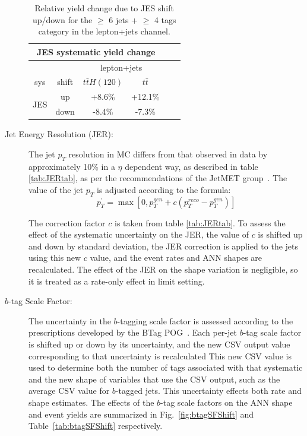 \begin{description}
\begin{table}[h] 
  \centering 
   \begin{tabular}{|c|c|c|c|c|c|} \hline 
\multicolumn{4}{|c|}{JES systematic yield change} \\ \hline
\multicolumn{2}{|c|}{ } & \multicolumn{2}{|c|}{lepton+jets} \\ \hline
sys & shift & $t\bar{t}H(120)$ & $t\bar{t}$  \\ \hline 
\multirow{2}{*}{JES} & up  & +8.6\% & +12.1\% \\
                     & down & -8.4\% & -7.3\% \\ \hline
  \end{tabular} 
  \caption{Relative yield change due to JES shift up/down for the
    $\ge$ 6 jets + $\ge$ 4 tags category in the
     lepton+jets channel.}
  \label{tab:JESShift}
\end{table} 

\item[Jet Energy Resolution (JER):]  The jet $p_T$ resolution in MC
  differs from that observed in data by approximately 10\% in a $\eta$
  dependent way, as described in table \ref{tab:JERtab}, as per the
  recommendations of the JetMET group~\cite{JERJetMET}.  The value of
  the jet $p_T$  is adjusted according to the formula:
\begin{equation}\label{eq:jer_formula}
p_T^{\prime} = \max{\left[0,p_T^{gen}+c(p_T^{reco}-p_T^{gen})\right]}
\end{equation}

  The correction factor $c$ is taken from table \ref{tab:JERtab}.  To
  assess the effect of the systematic uncertainty on the JER, the
  value of $c$ is shifted up and down by standard deviation, the JER
  correction is applied to the jets using this new $c$ value, and the
  event rates and ANN shapes are recalculated.  The effect of the JER
  on the shape variation is negligible, so it is treated as a
  rate-only effect in limit setting.  


\item[$b$-tag Scale Factor:] The uncertainty in the $b$-tagging
    scale factor is assessed according to the prescriptions developed
    by the BTag POG~\cite{btagSF}.  Each per-jet $b$-tag scale factor
    is shifted up or down by its uncertainty, and the new CSV output
    value corresponding to that uncertainty is recalculated  This new
    CSV value is used to determine both the number of tags associated with
    that systematic and the new shape of
    variables that use the CSV output, such as the average CSV value
    for $b$-tagged jets.  This uncertainty effects both rate and shape estimates.  
    The effects of the $b$-tag scale factors on the ANN shape and
    event yields are summarized in Fig.~\ref{fig:btagSFShift} and
    Table~\ref{tab:btagSFShift} respectively. 


\end{description}
